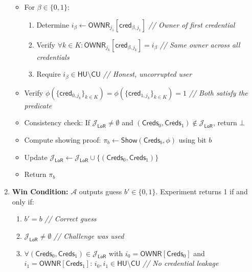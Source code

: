 \begin{enumerate}
\begin{itemize}
        \item For $\beta \in \{0,1\}$: 
        \begin{enumerate}
            \item Determine $i_\beta \gets \mathsf{OWNR}_{j_1}[\mathsf{cred}_{\beta,j_1}]$ \quad \emph{// Owner of first credential}
            \item Verify $\forall k \in K: \mathsf{OWNR}_{j_k}[\mathsf{cred}_{\beta,j_k}] = i_\beta$ \quad \emph{// Same owner across all credentials}
            \item Require $i_\beta \in \mathsf{HU} \setminus \mathsf{CU}$ \quad \emph{// Honest, uncorrupted user}
        \end{enumerate}
        
        \item Verify $\phi(\{\mathsf{cred}_{0,j_k}\}_{k \in K}) = \phi(\{\mathsf{cred}_{1,j_k}\}_{k \in K}) = 1$ \quad \emph{// Both satisfy the predicate}
        
        \item Consistency check: If $\mathcal{J}_{\mathsf{LoR}} \neq \emptyset$ and $(\mathsf{Creds}_0, \mathsf{Creds}_1) \notin \mathcal{J}_{\mathsf{LoR}}$, return $\bot$
        
        \item Compute showing proof: $\pi_b \gets \mathsf{Show}(\mathsf{Creds}_b, \phi)$ using bit $b$
        
        \item Update $\mathcal{J}_{\mathsf{LoR}} \gets \mathcal{J}_{\mathsf{LoR}} \cup \{(\mathsf{Creds}_0,\mathsf{Creds}_1)\}$
        
        \item Return $\pi_b$
    \end{itemize}

    \item \textbf{Win Condition:} $\mathcal{A}$ outputs guess $b' \in \{0,1\}$. 
    Experiment returns 1 if and only if:
    \begin{enumerate}
        \item $b' = b$ \quad \emph{// Correct guess}
        \item $\mathcal{J}_{\mathsf{LoR}} \neq \emptyset$ \quad \emph{// Challenge was used}
        \item $\forall (\mathsf{Creds}_0,\mathsf{Creds}_1) \in \mathcal{J}_{\mathsf{LoR}}$ with $i_0 = \mathsf{OWNR}[\mathsf{Creds}_0]$ and $i_1 = \mathsf{OWNR}[\mathsf{Creds}_1]$: $i_0, i_1 \in \mathsf{HU} \setminus \mathsf{CU}$ \quad \emph{// No credential leakage}
    \end{enumerate}
\end{enumerate}

